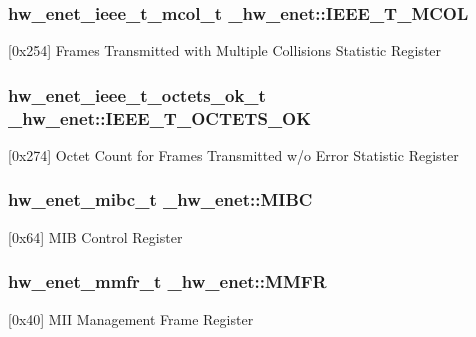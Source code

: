 \subsubsection[{\texorpdfstring{I\+E\+E\+E\+\_\+\+T\+\_\+\+M\+C\+OL}{IEEE_T_MCOL}}]{ {\bf hw\+\_\+enet\+\_\+ieee\+\_\+t\+\_\+mcol\+\_\+t} \+\_\+hw\+\_\+enet\+::\+I\+E\+E\+E\+\_\+\+T\+\_\+\+M\+C\+OL}\hypertarget{struct__hw__enet_aa82bf417f5e29ec2032a2b85ea80f2c4}{}\label{struct__hw__enet_aa82bf417f5e29ec2032a2b85ea80f2c4}
\mbox{[}0x254\mbox{]} Frames Transmitted with Multiple Collisions Statistic Register 
\subsubsection[{\texorpdfstring{I\+E\+E\+E\+\_\+\+T\+\_\+\+O\+C\+T\+E\+T\+S\+\_\+\+OK}{IEEE_T_OCTETS_OK}}]{ {\bf hw\+\_\+enet\+\_\+ieee\+\_\+t\+\_\+octets\+\_\+ok\+\_\+t} \+\_\+hw\+\_\+enet\+::\+I\+E\+E\+E\+\_\+\+T\+\_\+\+O\+C\+T\+E\+T\+S\+\_\+\+OK}\hypertarget{struct__hw__enet_aa341a0a7ca6f7823fec468a3a649d76b}{}\label{struct__hw__enet_aa341a0a7ca6f7823fec468a3a649d76b}
\mbox{[}0x274\mbox{]} Octet Count for Frames Transmitted w/o Error Statistic Register 
\subsubsection[{\texorpdfstring{M\+I\+BC}{MIBC}}]{ {\bf hw\+\_\+enet\+\_\+mibc\+\_\+t} \+\_\+hw\+\_\+enet\+::\+M\+I\+BC}\hypertarget{struct__hw__enet_ab403852c061acfde6983f4c1408ed148}{}\label{struct__hw__enet_ab403852c061acfde6983f4c1408ed148}
\mbox{[}0x64\mbox{]} M\+IB Control Register 
\subsubsection[{\texorpdfstring{M\+M\+FR}{MMFR}}]{ {\bf hw\+\_\+enet\+\_\+mmfr\+\_\+t} \+\_\+hw\+\_\+enet\+::\+M\+M\+FR}\hypertarget{struct__hw__enet_a64b3059a162707024dfc93de023b8589}{}\label{struct__hw__enet_a64b3059a162707024dfc93de023b8589}
\mbox{[}0x40\mbox{]} M\+II Management Frame Register 
